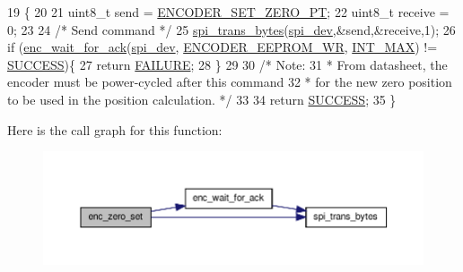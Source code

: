 \begin{DoxyCode}
19                              \{
20 
21     uint8\_t send = \hyperlink{encoder__functions_8h_aa2fec4e0eb5a7b3668158a57952b9dbe}{ENCODER\_SET\_ZERO\_PT};
22     uint8\_t receive = 0;
23     
24     \textcolor{comment}{/* Send command */}
25     \hyperlink{communication_2spi__functions_8c_a3ae450d2b3ece27bb6036f811a7625a9}{spi\_trans\_bytes}(\hyperlink{CommunicationV0_2communication_8c_a4788f0a5355494bc6c13690e28f43783}{spi\_dev},&send,&receive,1);
26     \textcolor{keywordflow}{if} (\hyperlink{group__enc_gad82fb44f2e735628ec95e003e4a1f93c}{enc\_wait\_for\_ack}(\hyperlink{CommunicationV0_2communication_8c_a4788f0a5355494bc6c13690e28f43783}{spi\_dev}, \hyperlink{encoder__functions_8h_ab815abd4b9b825c60dbb04aad0d0e846}{ENCODER\_EEPROM\_WR}, 
      \hyperlink{encoder__functions_8h_a9ec306f36d50c7375e74f0d1c55a3a67}{INT\_MAX}) != \hyperlink{calibration_2calibration_8h_aa90cac659d18e8ef6294c7ae337f6b58}{SUCCESS})\{ 
27         \textcolor{keywordflow}{return} \hyperlink{calibration_2calibration_8h_a6d58f9ac447476b4e084d7ca383f5183}{FAILURE};
28     \}
29 
30     \textcolor{comment}{/* Note: }
31 \textcolor{comment}{     *   From datasheet, the encoder must be power-cycled after this command}
32 \textcolor{comment}{     *   for the new zero position to be used in the position calculation. */}
33 
34     \textcolor{keywordflow}{return} \hyperlink{calibration_2calibration_8h_aa90cac659d18e8ef6294c7ae337f6b58}{SUCCESS};
35 \}
\end{DoxyCode}


Here is the call graph for this function\-:\nopagebreak
\begin{figure}[H]
\begin{center}
\leavevmode
\includegraphics[width=350pt]{group__enc_gaebbe7b9d3c2571f7481cefacbe36c498_cgraph}
\end{center}
\end{figure}


